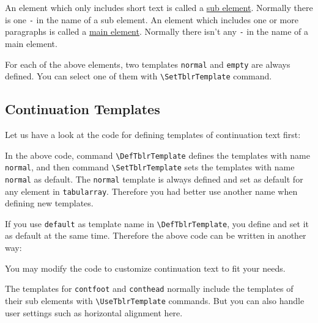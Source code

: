 \documentclass[oneside]{book}
\begin{document}
An element which only includes short text is called a \underline{sub element}.
Normally there is one \verb!-! in the name of a sub element.
An element which includes one or more paragraphs is called a \underline{main element}.
Normally there isn't any \verb!-! in the name of a main element.

For each of the above elements, two templates \verb!normal! and \verb!empty! are always defined.
You can select one of them with \verb!\SetTblrTemplate! command.

\subsection{Continuation Templates}

Let us have a look at the code for defining templates of continuation text first:

\begin{codehigh}
\end{codehigh}

In the above code, command \verb!\DefTblrTemplate! defines the templates with name \verb!normal!,
and then command \verb!\SetTblrTemplate! sets the templates with name \verb!normal! as default.
The \verb!normal! template is always defined and set as default for any element in \verb!tabularray!.
Therefore you had better use another name when defining new templates.

If you use \verb!default! as template name in \verb!\DefTblrTemplate!,
you define and set it as default at the same time.
Therefore the above code can be written in another way:

\begin{codehigh}
\end{codehigh}

You may modify the code to customize continuation text to fit your needs.

The templates for \verb!contfoot! and \verb!conthead! normally
include the templates of their sub elements with \verb!\UseTblrTemplate! commands.
But you can also handle user settings such as horizontal alignment here.

\begin{codehigh}
\end{codehigh}
\end{document}
